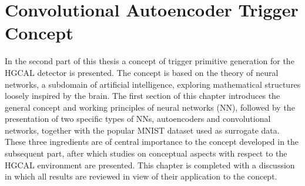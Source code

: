 \documentclass[../../main.tex]{subfiles}
\begin{document}
\section{Convolutional Autoencoder Trigger Concept}\label{chp:nn_tpg}
In the second part of this thesis a concept of trigger primitive generation for the HGCAL detector is presented. The concept is based on the theory of neural networks, a subdomain of artificial intelligence, exploring mathematical structures loosely inspired by the brain. The first section of this chapter introduces the general concept and working principles of neural networks (NN), followed by the presentation of two specific types of NNs, autoencoders and convolutional networks, together with the popular MNIST dataset used as surrogate data. These three ingredients are of central importance to the concept developed in the subsequent part, after which studies on conceptual aspects with respect to the HGCAL environment are presented. This chapter is completed with a discussion in which all results are reviewed in view of their application to the concept.
\end{document}
